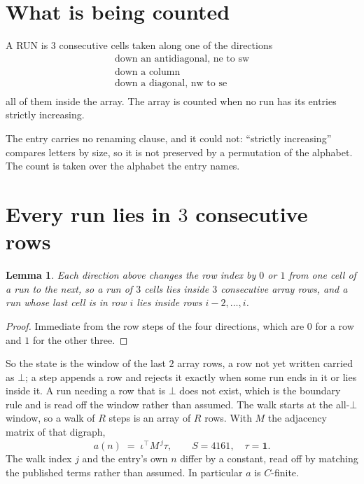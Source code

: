 \documentclass[11pt,a4paper]{article}
\theoremstyle{plain}
\newtheorem{lemma}[theorem]{Lemma}
\theoremstyle{definition}
\begin{document}
\section{What is being counted}

A RUN is $3$ consecutive cells taken along one of the directions
\[
\begin{array}{l}
\text{down an antidiagonal, ne to sw} \\
\text{down a column} \\
\text{down a diagonal, nw to se} \\
\end{array}
\]
all of them inside the array. The array is counted when no run has its entries strictly increasing.


The entry carries no renaming clause, and it could not: ``strictly increasing'' compares
letters by size, so it is not preserved by a permutation of the alphabet. The count is taken
over the alphabet the entry names.

\section{Every run lies in $3$ consecutive rows}

\begin{lemma}\label{lem:win}
Each direction above changes the row index by $0$ or $1$ from one cell of a run to the next, so
a run of $3$ cells lies inside $3$ consecutive array rows, and a run whose last cell is in
row $i$ lies inside rows $i-2,\dots,i$.
\end{lemma}

\begin{proof}
Immediate from the row steps of the four directions, which are $0$ for a row and $1$ for the
other three.
\end{proof}

So the state is the window of the last $2$ array rows, a row not yet written carried as
$\bot$; a step appends a row and rejects it exactly when some run ends in it or lies inside it.
A run needing a row that is $\bot$ does not exist, which is the boundary rule and is read off
the window rather than assumed. The walk starts at the all-$\bot$ window, so a walk of $R$ steps
is an array of $R$ rows. With $M$ the adjacency matrix of that digraph,
\[
a(n)\;=\;\iota^{\!\top}M^{\,j}\tau ,\qquad S=4161,\quad\tau=\mathbf{1} .
\]
The walk index $j$ and the entry's own $n$ differ by a constant, read off by matching the
published terms rather than assumed. In particular $a$ is $C$-finite.
\end{document}
